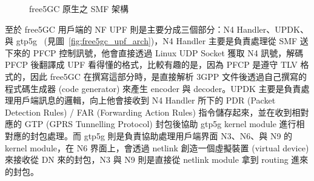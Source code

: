 \begin{figure}[htbp]
    \caption[free5GC 原生之 SMF 架構]{{\footnotesize free5GC 原生之 SMF 架構}}
    \label{fig:free5gc_smf_arch}
\end{figure}

至於 free5GC 用戶端的 NF UPF 則是主要分成三個部分：N4 Handler、UPDK、與 gtp5g~\cite{gtp5g} (見圖~\ref{fig:free5gc_upf_arch})，N4 Handler 主要是負責處理從 SMF 送下來的 PFCP 控制訊號，他會直接透過 Linux UDP Socket 獲取 N4 訊號，解碼 PFCP 後翻譯成 UPF 看得懂的格式，比較有趣的是，因為 PFCP 是遵守 TLV 格式的，因此 free5GC 在撰寫這部分時，是直接解析 3GPP 文件後透過自己撰寫的程式碼生成器 (code generator) 來產生 encoder 與 decoder。UPDK 主要是負責處理用戶端訊息的邏輯，向上他會接收到 N4 Handler 所下的 PDR (Packet Detection Rules) / FAR (Forwarding Action Rules) 指令儲存起來，並在收到相對應的 GTP (GPRS Tunnelling Protocol) 封包後協助 gtp5g kernel module 進行相對應的封包處理。而 gtp5g 則是負責協助處理用戶端界面 N3、N6、與 N9 的 kernel module，在 N6 界面上，會透過 netlink 創造一個虛擬裝置 (virtual device) 來接收從 DN 來的封包，N3 與 N9 則是直接從 netlink module 拿到 routing 進來的封包。

